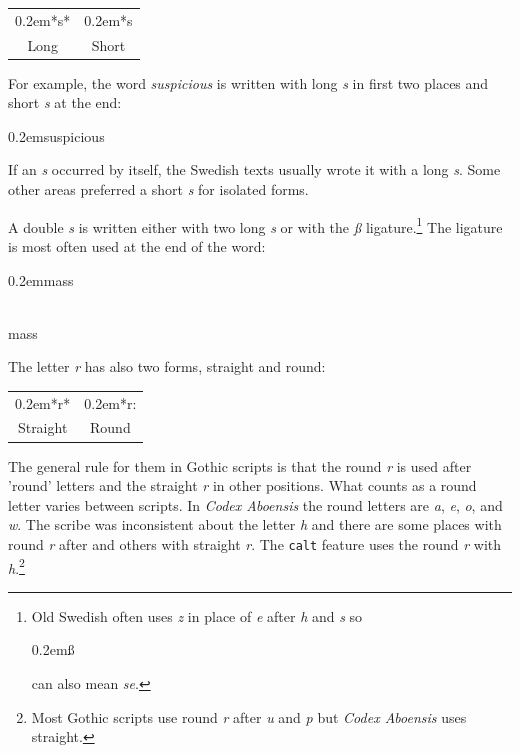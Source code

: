 \documentclass[a4paper]{article}
\newcommand{\samplefont}{\fontsize{16}{16}\abcursivefamily\spaceskip0.2em}
\newcommand{\sample}[1]{{\samplefont #1 \strut}}
\begin{document}
\begin{center}
  \begin{tabular}{cc}
    \sample{*s*} & \sample{*s} \\
    Long & Short \\
  \end{tabular}
\end{center}

For example, the word \emph{suspicious} is written with long \emph{s}
in first two places and short \emph{s} at the end: 

\begin{center}
  \sample{suspicious}
\end{center}

If an \emph{s} occurred by itself, the Swedish texts usually wrote it
with a long \emph{s}. Some other areas preferred a short \emph{s} for
isolated forms.

A double \emph{s} is written either with two long \emph{s} or with the
\emph{ß} ligature.\footnote{Old Swedish often uses \emph{z} in place of
  \emph{e} after \emph{h} and \emph{s} so \sample{ß} can also mean
  \emph{se}.} The ligature is most often used at the end of the word:

\begin{center}
  \sample{mass} \\
  mass
\end{center}


The letter \emph{r} has also two forms, straight and round:

\begin{center}
  \begin{tabular}{cc}
    \sample{*r*} & \sample{*r:} \\
    Straight & Round \\
  \end{tabular}
\end{center}

The general rule for them in Gothic scripts is that the round \emph{r}
is used after 'round' letters and the straight \emph{r} in other
positions. What counts as a round letter varies between scripts. In
\emph{Codex Aboensis} the round letters are \emph{a}, \emph{e},
\emph{o}, and \emph{w}. The scribe was inconsistent about the letter
\emph{h} and there are some places with round \emph{r} after and
others with straight \emph{r}. The \texttt{calt} feature uses the
round \emph{r} with \emph{h}.\footnote{Most Gothic scripts use round
  \emph{r} after \emph{u} and \emph{p} but \emph{Codex Aboensis} uses
  straight.}
\end{document}
